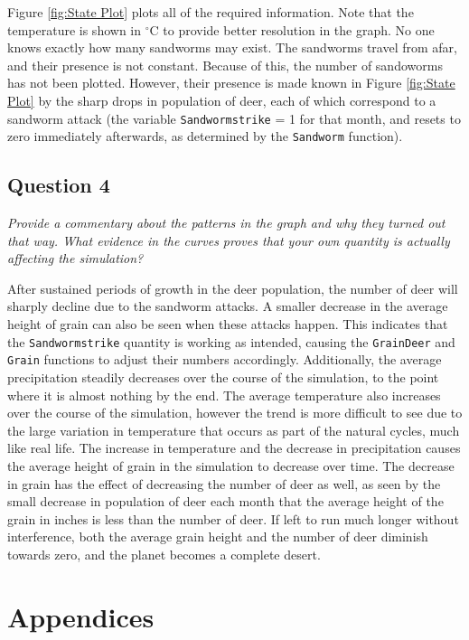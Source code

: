 \documentclass{article}
\begin{document}
Figure \ref{fig:State Plot} plots all of the required information.  Note that the temperature is shown in $^\circ$C to provide better resolution in the graph.  No one knows exactly how many sandworms may exist.  The sandworms travel from afar, and their presence is not constant.  Because of this, the number of sandoworms has not been plotted.  However, their presence is made known in Figure \ref{fig:State Plot} by the sharp drops in population of deer, each of which correspond to a sandworm attack (the variable \texttt{Sandwormstrike} = 1 for that month, and resets to zero immediately afterwards, as determined by the \texttt{Sandworm} function).

\subsection*{Question 4}
\textit{Provide a commentary about the patterns in the graph and why they turned out that way.  What evidence in the curves proves that your own quantity is actually affecting the simulation?}

After sustained periods of growth in the deer population, the number of deer will sharply decline due to the sandworm attacks.  A smaller decrease in the average height of grain can also be seen when these attacks happen.  This indicates that the \texttt{Sandwormstrike} quantity is working as intended, causing the \texttt{GrainDeer} and \texttt{Grain} functions to adjust their numbers accordingly.  Additionally, the average precipitation steadily decreases over the course of the simulation, to the point where it is almost nothing by the end.  The average temperature also increases over the course of the simulation, however the trend is more difficult to see due to the large variation in temperature that occurs as part of the natural cycles, much like real life.  The increase in temperature and the decrease in precipitation causes the average height of grain in the simulation to decrease over time.  The decrease in grain has the effect of decreasing the number of deer as well, as seen by the small decrease in population of deer each month that the average height of the grain in inches is less than the number of deer.  If left to run much longer without interference, both the average grain height and the number of deer diminish towards zero, and the planet becomes a complete desert.

\newpage
\section{Appendices}
\end{document}
